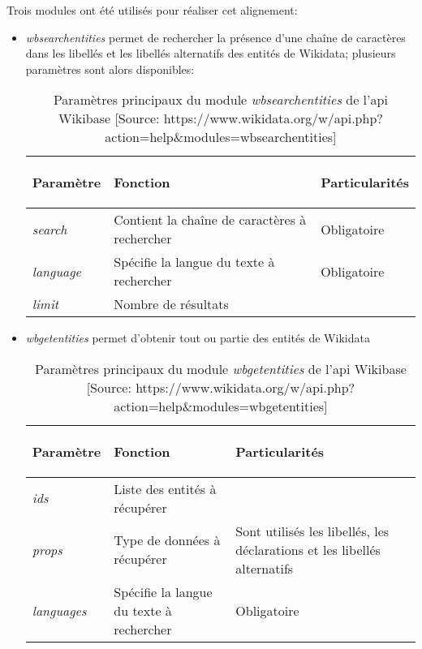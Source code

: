 Trois modules ont été utilisés pour réaliser cet alignement:
\begin{itemize}
	\item \textit{wbsearchentities} permet de rechercher la présence d'une chaîne de caractères dans les libellés et les libellés alternatifs des entités de Wikidata; plusieurs paramètres sont alors disponibles:
	\begin{table}
		\centering
		\begin{tabularx}{15cm}{|X|X|X|}
			\hline
			\begin{center}Paramètre\end{center}&\begin{center}Fonction\end{center}&\begin{center}Particularités\end{center}  \tabularnewline \hline
			\textit{search}&Contient la chaîne de caractères à rechercher&Obligatoire\tabularnewline \hline
			\textit{language}&Spécifie la langue du texte à rechercher&Obligatoire\tabularnewline \hline
			\textit{limit}&Nombre de résultats&\tabularnewline \hline
		\end{tabularx}
	\caption[Paramètres principaux du module \textit{wbsearchentities} de l'\ac{api} Wikibase]{Paramètres principaux du module \textit{wbsearchentities} de l'\ac{api} Wikibase [Source: https://www.wikidata.org/w/api.php?action=help\&modules=wbsearchentities]}
	\label{wbsearchentities}
	\end{table}
	\item \textit{wbgetentities} permet d'obtenir tout ou partie des entités de Wikidata
	\begin{table}
		\centering
		\begin{tabularx}{15cm}{|X|X|X|}
			\hline
			\begin{center}Paramètre\end{center}&\begin{center}Fonction\end{center}&\begin{center}Particularités\end{center}  \tabularnewline \hline
			\textit{ids}&Liste des entités à récupérer&\tabularnewline \hline
			\textit{props}&Type de données à récupérer&Sont utilisés les libellés, les déclarations et les libellés alternatifs\tabularnewline \hline
			\textit{languages}&Spécifie la langue du texte à rechercher&Obligatoire\tabularnewline \hline
		\end{tabularx}
		\caption[Paramètres principaux du module \textit{wbgetentities} de l'\ac{api} Wikibase]{Paramètres principaux du module \textit{wbgetentities} de l'\ac{api} Wikibase [Source: https://www.wikidata.org/w/api.php?action=help\&modules=wbgetentities]}

\end{table}
\end{itemize}
